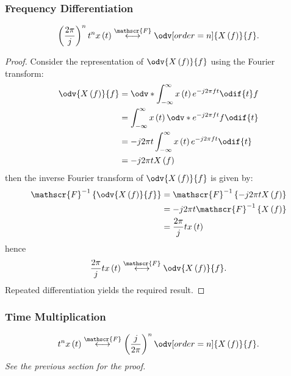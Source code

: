 \documentclass{article}
\begin{document}
\subsubsection{Frequency Differentiation}
\begin{equation*}
    \left( \frac{2\pi}{j} \right)^n t^n x\left( t \right) \overset{\mathscr{F}}{\longleftrightarrow} \odv[order=n]{X\left( f \right)}{f}.
\end{equation*}
\begin{proof}
    Consider the representation of \(\odv{X\left( f \right)}{f}\) using the Fourier transform:
    \begin{align*}
        \odv{X\left( f \right)}{f} & = \odv*{\int_{-\infty}^\infty x\left( t \right) e^{-j 2\pi f t}\odif{t}}{f} \\
                                   & = \int_{-\infty}^\infty x\left( t \right) \odv*{e^{-j 2\pi f t}}{f}\odif{t} \\
                                   & = -j 2\pi t \int_{-\infty}^\infty x\left( t \right) e^{-j 2\pi f t}\odif{t} \\
                                   & = -j 2\pi t X\left( f \right)
    \end{align*}
    then the inverse Fourier transform of \(\odv{X\left( f \right)}{f}\) is given by:
    \begin{align*}
        \mathscr{F}^{-1}\left\{ \odv{X\left( f \right)}{f} \right\} & = \mathscr{F}^{-1}\left\{ -j 2\pi t X\left( f \right) \right\} \\
                                                                    & = -j 2\pi t \mathscr{F}^{-1}\left\{ X\left( f \right) \right\} \\
                                                                    & = \frac{2\pi}{j} t x\left( t \right)
    \end{align*}
    hence
    \begin{equation*}
        \frac{2\pi}{j} t x\left( t \right) \overset{\mathscr{F}}{\longleftrightarrow} \odv{X\left( f \right)}{f}.
    \end{equation*}
    Repeated differentiation yields the required result.
\end{proof}
\subsubsection{Time Multiplication}
\begin{equation*}
    t^n x\left( t \right) \overset{\mathscr{F}}{\longleftrightarrow} \left( \frac{j}{2\pi} \right)^n \odv[order=n]{X\left( f \right)}{f}.
\end{equation*}
\textit{See the previous section for the proof.}
\end{document}
